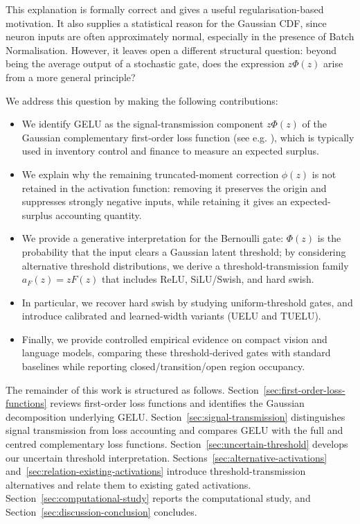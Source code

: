 \documentclass[11pt]{article}
\begin{document}
This explanation is formally correct and gives a useful regularisation-based motivation. It also supplies a statistical reason for the Gaussian CDF, since neuron inputs are often approximately normal, especially in the presence of Batch Normalisation. However, it leaves open a different structural question: beyond being the average output of a stochastic gate, does the expression $ z\Phi(z) $ arise from a more general principle? 

We address this question by making the following contributions: 
\begin{itemize}
\item We identify GELU as the signal-transmission component $z\Phi(z)$ of the Gaussian complementary first-order loss function (see e.g. \cite{hadley1963inventory,Zipkin2000-di}), which is typically used in inventory control and finance to measure an expected surplus.
\item We explain why the remaining truncated-moment correction $\phi(z)$ is not retained in the activation function: removing it preserves the origin and suppresses strongly negative inputs, while retaining it gives an expected-surplus accounting quantity.
\item We provide a generative interpretation for the Bernoulli gate: $\Phi(z)$ is the probability that the input clears a Gaussian latent threshold; by considering alternative threshold distributions, we derive a threshold-transmission family $a_F(z)=zF(z)$ that includes ReLU, SiLU/Swish, and hard swish.
\item In particular, we recover hard swish \cite{howard2019mobilenetv3} by studying uniform-threshold gates, and introduce calibrated and learned-width variants (UELU and TUELU). 
\item Finally, we provide controlled empirical evidence on compact vision and language models, comparing these threshold-derived gates with standard baselines while reporting closed/transition/open region occupancy.
\end{itemize}
The remainder of this work is structured as follows. 
Section~\ref{sec:first-order-loss-functions} reviews first-order loss functions and identifies the Gaussian decomposition underlying GELU. 
Section~\ref{sec:signal-transmission} distinguishes signal transmission from loss accounting and compares GELU with the full and centred complementary loss functions. 
Section~\ref{sec:uncertain-threshold} develops our uncertain threshold interpretation. 
Sections~\ref{sec:alternative-activations} and~\ref{sec:relation-existing-activations} introduce threshold-transmission alternatives and relate them to existing gated activations. 
Section~\ref{sec:computational-study} reports the computational study, and Section~\ref{sec:discussion-conclusion} concludes.
\end{document}
